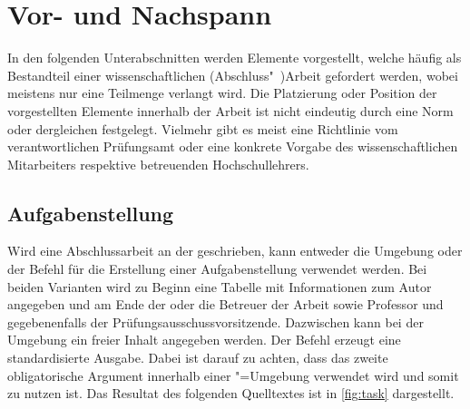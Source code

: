 \documentclass[%
  english,ngerman,%
  geometry=no,DIV=12,automark,%
]{tudscrartcl}
\begin{document}
\section{Vor- und Nachspann}
In den folgenden Unterabschnitten werden Elemente vorgestellt, welche häufig 
als Bestandteil einer wissenschaftlichen (Abschluss"~)Arbeit gefordert werden, 
wobei meistens nur eine Teilmenge verlangt wird. Die Platzierung oder Position 
der vorgestellten Elemente innerhalb der Arbeit ist nicht eindeutig durch eine 
Norm oder dergleichen festgelegt. Vielmehr gibt es meist eine Richtlinie vom 
verantwortlichen Prüfungsamt oder eine konkrete Vorgabe des wissenschaftlichen 
Mitarbeiters respektive betreuenden Hochschullehrers.


\subsection{Aufgabenstellung}
\label{sec:task}
Wird eine Abschlussarbeit an der \TnUD geschrieben, kann entweder die Umgebung 
 oder der Befehl  für die Erstellung einer 
Aufgabenstellung verwendet werden. Bei beiden Varianten wird zu Beginn eine 
Tabelle mit Informationen zum Autor angegeben und am Ende der oder die Betreuer 
der Arbeit sowie Professor und gegebenenfalls der Prüfungsausschussvorsitzende. 
Dazwischen kann bei der Umgebung  ein freier Inhalt angegeben 
werden. Der Befehl  erzeugt eine standardisierte Ausgabe. Dabei 
ist darauf zu achten, dass das zweite obligatorische Argument innerhalb einer 
"=Umgebung verwendet wird und somit  zu 
nutzen ist. Das Resultat des folgenden Quelltextes ist in \autoref{fig:task} 
dargestellt.
%
\end{document}
